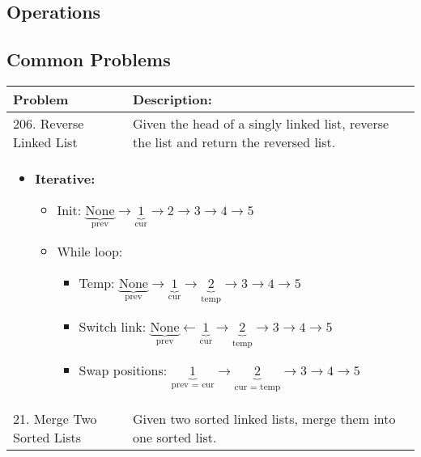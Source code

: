 \subsection{Operations}
\newpage

\subsection{Common Problems}
\begin{summary}
    \begin{center}
        \begin{tabular}{ll}
            \toprule
            \textbf{Problem} & \textbf{Description:} \\
            \midrule
                206. Reverse Linked List & Given the head of a singly linked list, reverse the list and return the reversed list. \\
                \multicolumn{2}{p{\linewidth}}{
                    \begin{itemize}
                        \item \textbf{Iterative:} 
                        \begin{itemize}
                            \item Init: $\underbrace{\text{None}}_{\text{prev}} \rightarrow \underbrace{1}_{\text{cur}} \rightarrow 2 \rightarrow 3 \rightarrow 4 \rightarrow 5$
                            \item While loop: 
                            \begin{itemize}
                                \item Temp: $\underbrace{\text{None}}_{\text{prev}} \rightarrow \underbrace{1}_{\text{cur}} \rightarrow \underbrace{2}_{\text{temp}} \rightarrow 3 \rightarrow 4 \rightarrow 5$
                                \item Switch link: $\underbrace{\text{None}}_{\text{prev}} \leftarrow \underbrace{1}_{\text{cur}} \rightarrow \underbrace{2}_{\text{temp}} \rightarrow 3 \rightarrow 4 \rightarrow 5$
                                \item Swap positions: $\underbrace{1}_{\text{prev = cur}} \rightarrow \underbrace{2}_{\text{cur = temp}} \rightarrow 3 \rightarrow 4 \rightarrow 5$
                            \end{itemize}
                        \end{itemize}                        
                    \end{itemize}
                } \\
                \midrule
                21. Merge Two Sorted Lists & Given two sorted linked lists, merge them into one sorted list. \\
            \bottomrule
        \end{tabular}
    \end{center}
\end{summary}


